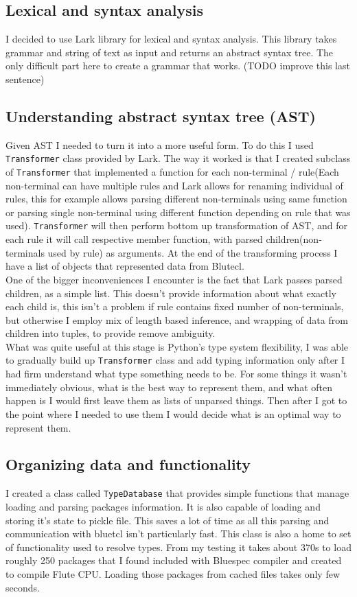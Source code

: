 \documentclass[14pt]{report}
\begin{document}
\subsection{Lexical and syntax analysis}
I decided to use Lark library for lexical and syntax analysis. This library takes grammar and string of text as input and returns an abstract syntax tree. The only difficult part here to create a grammar that works. (TODO improve this last sentence)

\subsection{Understanding abstract syntax tree (AST)}
Given AST I needed to turn it into a more useful form. To do this I used \verb!Transformer! class provided by Lark. The way it worked is that I created subclass of \verb!Transformer! that implemented a function for each non-terminal / rule(Each non-terminal can have multiple rules and Lark allows for renaming individual of rules, this for example allows parsing different non-terminals using same function or parsing single non-terminal using different function depending on rule that was used). \verb!Transformer! will then perform bottom up transformation of AST, and for each rule it will call respective member function, with parsed children(non-terminals used by rule) as arguments. At the end of the transforming process I have a list of objects that represented data from Blutecl.
\\
One of the bigger inconveniences I encounter is the fact that Lark passes parsed children, as a simple list. This doesn't provide information about what exactly each child is, this isn't a problem if rule contains fixed number of non-terminals, but otherwise I employ mix of length based inference, and wrapping of data from children into tuples, to provide remove ambiguity.
\\
What was quite useful at this stage is Python's type system flexibility, I was able to gradually build up \verb!Transformer! class and add typing information only after I had firm understand what type something needs to be. For some things it wasn't immediately obvious, what is the best way to represent them, and what often happen is I would first leave them as lists of unparsed things. Then after I got to the point where I needed to use them I would decide what is an optimal way to represent them.

\subsection{Organizing data and functionality}
I created a class called \verb!TypeDatabase! that provides simple functions that manage loading and parsing packages information. It is also capable of loading and storing it's state to pickle file. This saves a lot of time as all this parsing and communication with bluetcl isn't particularly fast. This class is also a home to set of functionality used to resolve types. From my testing it takes about 370s to load roughly 250 packages that I found included with Bluespec compiler and created to compile Flute CPU. Loading those packages from cached files takes only few seconds.
\end{document}
